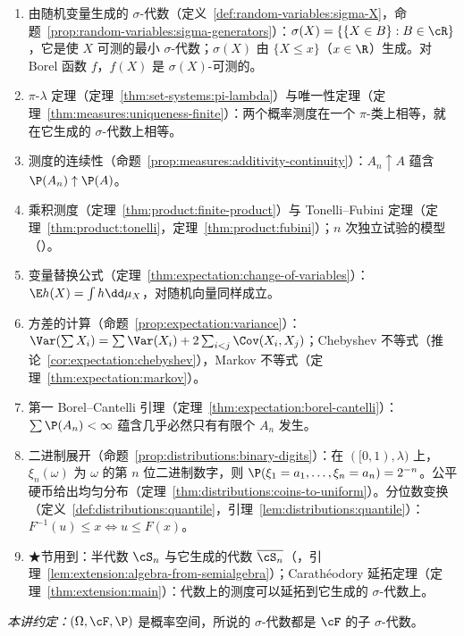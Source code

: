 \begin{enumerate}
\item 由随机变量生成的 $\sigma$-代数（定义~\ref{def:random-variables:sigma-X}，命题~\ref{prop:random-variables:sigma-generators}）：$\sigma(X)=\{\{X\in B\}:B\in\cR\}$，它是使 $X$ 可测的最小 $\sigma$-代数；$\sigma(X)$ 由 $\{X\leqslant x\}$（$x\in\R$）生成。对 Borel 函数 $f$，$f(X)$ 是 $\sigma(X)$-可测的。
\item $\pi$-$\lambda$ 定理（定理~\ref{thm:set-systems:pi-lambda}）与唯一性定理（定理~\ref{thm:measures:uniqueness-finite}）：两个概率测度在一个 $\pi$-类上相等，就在它生成的 $\sigma$-代数上相等。
\item 测度的连续性（命题~\ref{prop:measures:additivity-continuity}）：$A_n\uparrow A$ 蕴含 $\P(A_n)\uparrow \P(A)$。
\item 乘积测度（定理~\ref{thm:product:finite-product}）与 Tonelli--Fubini 定理（定理~\ref{thm:product:tonelli}，定理~\ref{thm:product:fubini}）；$n$ 次独立试验的模型（）。
\item 变量替换公式（定理~\ref{thm:expectation:change-of-variables}）：$\E h(X)=\int h\dd\mu_X$，对随机向量同样成立。
\item 方差的计算（命题~\ref{prop:expectation:variance}）：$\Var(\sum X_i)=\sum\Var(X_i)+2\sum_{i<j}\Cov(X_i,X_j)$；Chebyshev 不等式（推论~\ref{cor:expectation:chebyshev}），Markov 不等式（定理~\ref{thm:expectation:markov}）。
\item 第一 Borel--Cantelli 引理（定理~\ref{thm:expectation:borel-cantelli}）：$\sum \P(A_n)<\infty$ 蕴含几乎必然只有有限个 $A_n$ 发生。
\item 二进制展开（命题~\ref{prop:distributions:binary-digits}）：在 $([0,1),\lambda)$ 上，$\xi_n(\omega)$ 为 $\omega$ 的第 $n$ 位二进制数字，则 $\P(\xi_1=a_1,\dots,\xi_n=a_n)=2^{-n}$。公平硬币给出均匀分布（定理~\ref{thm:distributions:coins-to-uniform}）。分位数变换（定义~\ref{def:distributions:quantile}，引理~\ref{lem:distributions:quantile}）：$F^{-1}(u)\leqslant x\iff u\leqslant F(x)$。
\item ★节用到：半代数 $\cS_n$ 与它生成的代数 $\overline{\cS_n}$（，引理~\ref{lem:extension:algebra-from-semialgebra}）；Carathéodory 延拓定理（定理~\ref{thm:extension:main}）：代数上的测度可以延拓到它生成的 $\sigma$-代数上。
\end{enumerate}

\emph{本讲约定：}$(\Omega,\cF,\P)$ 是概率空间，所说的 $\sigma$-代数都是 $\cF$ 的子 $\sigma$-代数。

